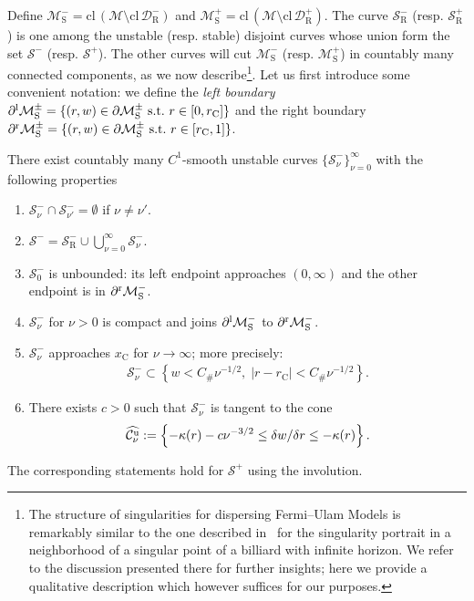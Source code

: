 \documentclass[AHL, Unicode, longabstracts,published]{cedram}
\newcommand{\ct}{r}
\newcommand{\curv}{\kappa}
\newcommand{\st}{\ \text{s.t.}\ }
\newcommand{\unstable}{\text{u}}
\newcommand{\crit}{\mathrm{C}}
\newcommand{\ctc}{\ct_\crit}
\newcommand{\xc}{x_\crit}
\newcommand{\cell}{\mathcal{D}}
\newcommand{\csp}{\mathcal{M}}
\newcommand{\cone}{\mathcal{C}}
\newcommand{\csps}{\csp_\text{S}}
\newcommand{\lboundary}{\partial^\text l}
\newcommand{\rboundary}{\partial^\text r}
\newcommand{\recoPrivate}{\mathrm{R}}
\newcommand{\reco}{{\cell^-_{\recoPrivate}}}
\newcommand{\backReco}{{\cell^+_{\recoPrivate}}}
\newcommand{\coneu}{\cone^\unstable}
\newcommand{\singPrivate}{\mathcal{S}}
\newcommand{\singReco}{\singPrivate_{\recoPrivate}}
\newcommand{\singForward}[1]{\singPrivate^+_{#1}}
\newcommand{\singBackward}[1]{\singPrivate^-_{#1}}
\newcommand{\indCell}{\nu}
\newcommand{\Const}{C_\#}
\newcommand{\clo}{\text{cl}\,}
\newcommand*{\relabel}{\renewcommand{\labelenumi}{(\theenumi)}}
\newcommand*{\alphenumi}{\renewcommand*{\theenumi}{\alph{enumi}}\relabel}
\let\oldhat\hat
\renewcommand*{\hat}[1]{\mathchoice{\widehat{#1}}{\widehat{#1}}{\oldhat{#1}}{\oldhat{#1}}}
\begin{document}
Define $\csps^- = \clo(\csp\setminus\clo\reco)$ and $\csps^+ = \clo(\csp\setminus\clo\backReco)$. The curve $\singReco^-$ (resp. $\singReco^+$) is one among the unstable (resp. stable) disjoint curves whose union form the set $\singBackward{}$ (resp. $\singForward{}$). The other curves will cut $\csps^-$ (resp. $\csps^+$) in countably many connected components, as we now describe\footnote{The structure of singularities for dispersing Fermi--Ulam Models is remarkably similar to the one described in~\cite[\S4.10]{ChM} for the singularity portrait in a neighborhood of a singular point of a billiard with infinite horizon. We refer to the discussion presented there for further insights; here we provide a qualitative description which however suffices for our purposes.}. Let us first introduce some convenient notation: we define the \emph{left boundary} $\lboundary\csps^\pm = \{(\ct,w)\in\partial\csps^\pm \st
\ct\in[0,\ctc]\}$ and the right boundary $\rboundary\csps^\pm = \{(\ct,w)\in\partial\csps^\pm \st
\ct\in[\ctc,1]\}$.
\begin{lemm}\label{LmSingF}
There exist countably many $C^1$-smooth unstable curves $\{\singBackward{\indCell}\}_{\indCell = 0}^{\infty}$ with the following properties
\begin{enumerate}\alphenumi
\item\label{lemm3.11.1} $\singBackward{\indCell}\cap\singBackward{\indCell'} = \emptyset$ if $\indCell\ne\indCell'$.
\item\label{lemm3.11.2} $\singBackward{} = \singReco^-\cup\bigcup_{\indCell = 0}^{\infty}\singBackward{\indCell}$.
\item\label{lemm3.11.3} $\singBackward{0}$ is unbounded: its left endpoint approaches $(0,\infty)$ and the other endpoint is in $\rboundary\csps^-$.
\item \label{lemm3.11.4}$\singBackward{\indCell}$ for $\indCell > 0$ is compact and joins $\lboundary\csps^-$ to $\rboundary\csps^-$.
\item\label{lemm3.11.5} $\singBackward{\indCell}$ approaches $\xc$ for $\indCell\to\infty$; more precisely:
\begin{align*}
\singBackward{\indCell}\subset\left\{w < \Const \indCell^{-1/2},\; |\ct-\ctc|< \Const \indCell^{-1/2} \right\}.
\end{align*}
\item\label{lemm3.11.6} There exists $c > 0$ such that $\singBackward{\indCell}$ is tangent to the cone
\begin{align*}
\hat{\coneu_{\indCell}} := \left\{-\curv(\ct)-c\indCell^{-3/2}\le\delta w/\delta r\le -\curv(\ct)\right\}.
\end{align*}
\end{enumerate}
The corresponding statements hold for $\singForward{}$ using the involution.
\end{lemm}
\end{document}
